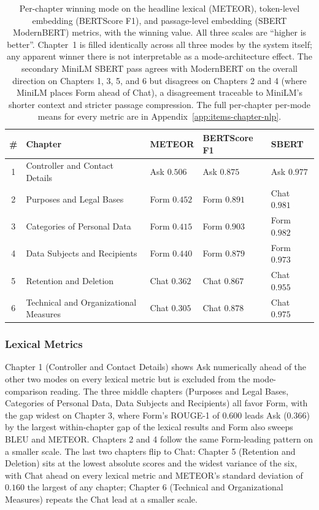\begin{table}[htbp]
\centering
\begin{tabularx}{\linewidth}{@{}c X l l l@{}}
\toprule
\# & Chapter & METEOR & BERTScore F1 & SBERT \\
\midrule
1 & Controller and Contact Details              & Ask\hphantom{m}  $0.506$ & Ask\hphantom{m}  $0.875$ & Ask\hphantom{m}  $0.977$ \\
2 & Purposes and Legal Bases                    & Form $0.452$ & Form $0.891$ & Chat $0.981$ \\
3 & Categories of Personal Data                 & Form $0.415$ & Form $0.903$ & Form $0.982$ \\
4 & Data Subjects and Recipients                & Form $0.440$ & Form $0.879$ & Form $0.973$ \\
5 & Retention and Deletion                      & Chat $0.362$ & Chat $0.867$ & Chat $0.955$ \\
6 & Technical and Organizational Measures       & Chat $0.305$ & Chat $0.878$ & Chat $0.975$ \\
\bottomrule
\end{tabularx}
\caption{Per-chapter winning mode on the headline lexical (METEOR),
token-level embedding (BERTScore F1), and passage-level embedding
(SBERT ModernBERT) metrics, with the winning value. All three
scales are ``higher is better''. Chapter~1 is filled identically
across all three modes by the system itself; any apparent winner
there is not interpretable as a mode-architecture effect. The
secondary MiniLM SBERT pass agrees with ModernBERT on the
overall direction on Chapters 1, 3, 5, and 6 but disagrees on
Chapters 2 and 4 (where MiniLM places Form ahead of Chat), a
disagreement traceable to MiniLM's shorter context and stricter
passage compression. The full per-chapter per-mode means for every
metric are in Appendix~\ref{app:items-chapter-nlp}.}
\label{tab:nlp-chapter-winners}
\end{table}

\subsubsection{Lexical Metrics}
\label{ssec:nlp-chapter-lexical}

Chapter 1 (Controller and Contact Details) shows Ask numerically
ahead of the other two modes on every lexical metric but is excluded from the mode-comparison reading.
The three middle chapters (Purposes and Legal Bases, Categories of Personal Data, Data
Subjects and Recipients) all favor Form, with the gap widest on
Chapter 3, where Form's ROUGE-1 of $0.600$ leads Ask ($0.366$) by
the largest within-chapter gap of the lexical results and Form
also sweeps BLEU and METEOR. Chapters 2 and 4 follow the same
Form-leading pattern on a smaller scale. The last two chapters
flip to Chat: Chapter 5 (Retention and Deletion) sits at the
lowest absolute scores and the widest variance of the six, with
Chat ahead on every lexical metric and METEOR's standard
deviation of $0.160$ the largest of any chapter; Chapter 6
(Technical and Organizational Measures) repeats the Chat lead at
a smaller scale.

